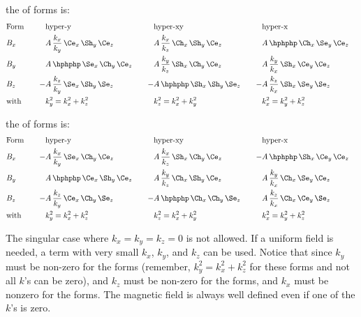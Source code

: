 the   of forms is:
\begin{alignat}{7}
  & \text{Form} \quad  && \text{hyper-y} \quad && \text{hyper-xy} \quad && \text{hyper-x} \quad \CRNO
  & B_x  
    & & A \, \dfrac{k_x}{k_y} \, \Ce_x \, \Sh_y \, \Ce_z \quad
    & & A \, \dfrac{k_x}{k_z} \, \Ch_x \, \Sh_y \, \Ce_z \quad
    & & A \, \hphphp          \, \Ch_x \, \Se_y \, \Ce_z \quad \CRNO
  & B_y
    & & A \, \hphphp          \, \Se_x \, \Ch_y \, \Ce_z \quad
    & & A \, \dfrac{k_y}{k_z} \, \Sh_x \, \Ch_y \, \Ce_z \quad
    & & A \, \dfrac{k_y}{k_x} \, \Sh_x \, \Ce_y \, \Ce_z \quad \\
  & B_z
    &-& A \, \dfrac{k_z}{k_y} \, \Se_x \, \Sh_y \, \Se_z \quad
    &-& A \, \hphphp          \, \Sh_x \, \Sh_y \, \Se_z \quad
    &-& A \, \dfrac{k_z}{k_x} \, \Sh_x \, \Se_y \, \Se_z \quad \CRNO
  & \text{with} 
    && k_y^2 = k_x^2 + k_z^2 
    && k_z^2 = k_x^2 + k_y^2
    && k_x^2 = k_y^2 + k_z^2 \nonumber
\end{alignat}

the   of forms is:
\begin{alignat}{7}
  & \text{Form} \quad  && \text{hyper-y} \quad && \text{hyper-xy} \quad && \text{hyper-x} \quad \CRNO
  & B_x  
    &-& A \, \dfrac{k_x}{k_y} \, \Se_x \, \Ch_y \, \Ce_z \quad
    & & A \, \dfrac{k_x}{k_z} \, \Sh_x \, \Ch_y \, \Ce_z \quad
    &-& A \, \hphphp          \, \Sh_x \, \Ce_y \, \Ce_z \quad \CRNO
  & B_y
    & & A \, \hphphp          \, \Ce_x \, \Sh_y \, \Ce_z \quad
    & & A \, \dfrac{k_y}{k_z} \, \Ch_x \, \Sh_y \, \Ce_z \quad
    & & A \, \dfrac{k_y}{k_x} \, \Ch_x \, \Se_y \, \Ce_z \quad \label{bsq} \\
  & B_z
    &-& A \, \dfrac{k_z}{k_y} \, \Ce_x \, \Ch_y \, \Se_z \quad
    &-& A \, \hphphp          \, \Ch_x \, \Ch_y \, \Se_z \quad
    & & A \, \dfrac{k_z}{k_x} \, \Ch_x \, \Ce_y \, \Se_z \quad \CRNO
  & \text{with} 
    && k_y^2 = k_x^2 + k_z^2 
    && k_z^2 = k_x^2 + k_y^2
    && k_x^2 = k_y^2 + k_z^2 \nonumber
\end{alignat}


The singular case where $k_x = k_y = k_z = 0$ is not allowed. If a uniform field is needed, a term
with very small $k_x$, $k_y$, and $k_z$ can be used. Notice that since $k_y$ must be non-zero for
the  forms (remember, $k_y^2 = k_x^2 + k_z^2$ for these forms and not all $k$'s can be
zero), and $k_z$ must be non-zero for the  forms, and $k_x$ must be nonzero for the
 forms. The magnetic field is always well defined even if one of the $k$'s is zero.

